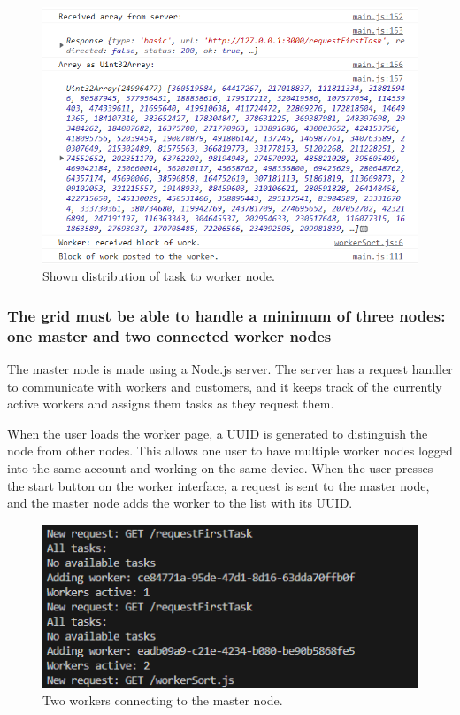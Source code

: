 \begin{figure}[H]
    \centering
    \includegraphics[scale=0.75]{figures/distributeWorkToWorker.png}
    \caption{Shown distribution of task to worker node.}
    \label{fig:Distribution of Task}
\end{figure}


\subsubsection{The grid must be able to handle a minimum of three nodes: one master and two connected worker nodes}
The master node is made using a Node.js server. The server has a request handler to communicate with workers and customers, and it keeps track of the currently active workers and assigns them tasks as they request them.

When the user loads the worker page, a UUID is generated to distinguish the node from other nodes. This allows one user to have multiple worker nodes logged into the same account and working on the same device.
When the user presses the start button on the worker interface, a request is sent to the master node, and the master node adds the worker to the list with its UUID.

\begin{figure}[H]
    \centering
    \includegraphics[scale=1]{figures/WorkersConnecting.png}
        \caption{Two workers connecting to the master node.}
    \label{fig:Workers connecting}
\end{figure}

